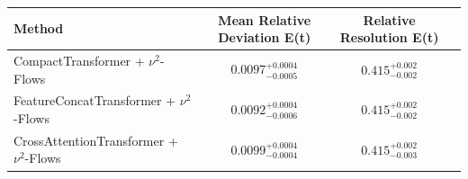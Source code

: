     \begin{tabular}{lccc}
        \toprule
        Method & Mean Relative Deviation E(t) & Relative Resolution E(t) \\
        \midrule
        CompactTransformer + $\nu^2$-Flows & $0.0097_{-0.0005}^{+0.0004}$ & $0.415_{-0.002}^{+0.002}$ \\
        FeatureConcatTransformer + $\nu^2$-Flows & $0.0092_{-0.0006}^{+0.0004}$ & $0.415_{-0.002}^{+0.002}$ \\
        CrossAttentionTransformer + $\nu^2$-Flows & $0.0099_{-0.0004}^{+0.0004}$ & $0.415_{-0.003}^{+0.002}$ \\
        \bottomrule
    \end{tabular}